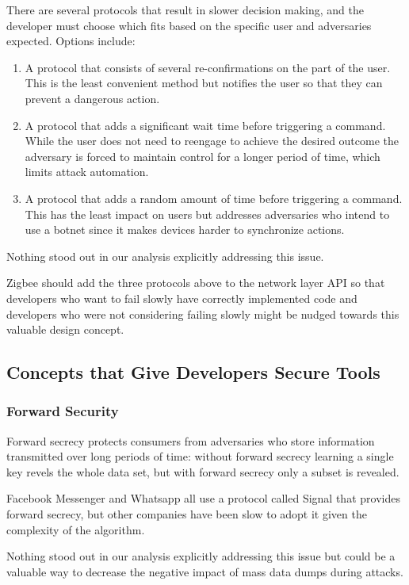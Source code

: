  There are several protocols that result in slower decision making, and the developer must choose which fits based on the specific user and adversaries expected. Options include:
\begin{enumerate}
\item A protocol that consists of several re-confirmations on the part of the user. This is the least convenient method but notifies the user so that they can prevent a dangerous action.
\item A protocol that adds a significant wait time before triggering a command. While the user does not need to reengage to achieve the desired outcome the adversary is forced to maintain control for a longer period of time, which limits attack automation.
\item A protocol that adds a random amount of time before triggering a command. This has the least impact on users but addresses adversaries who intend to use a botnet since it makes devices harder to synchronize actions.
\end{enumerate}


 Nothing stood out in our analysis explicitly addressing this issue.


Zigbee should add the three protocols above to the network layer API so that developers who want to fail slowly have correctly implemented code and developers who were not considering failing slowly might be nudged towards this valuable design concept.

\subsection{Concepts that Give Developers Secure Tools}
\subsubsection{Forward Security}
Forward secrecy protects consumers from adversaries who store information transmitted over long periods of time: without forward secrecy learning a single key revels the whole data set, but with forward secrecy only a subset is revealed. 


 Facebook Messenger and Whatsapp all use a protocol called Signal that provides forward secrecy, but other companies have been slow to adopt it given the complexity of the algorithm. 


 Nothing stood out in our analysis explicitly addressing this issue but could be a valuable way to decrease the negative impact of mass data dumps during attacks.


